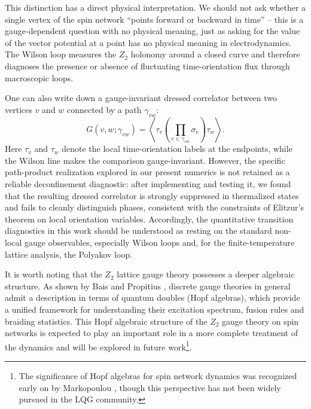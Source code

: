 \documentclass[preprint]{SciPost}
\theoremstyle{plain} %
\begin{document}
This distinction has a direct physical interpretation. We should not ask whether a single vertex of the spin network ``points forward or backward in time'' -- this is a gauge-dependent question with no physical meaning, just as asking for the value of the vector potential at a point has no physical meaning in electrodynamics. The Wilson loop measures the $Z_2$ holonomy around a closed curve and therefore diagnoses the presence or absence of fluctuating time-orientation flux through macroscopic loops.

One can also write down a gauge-invariant dressed correlator between two vertices $v$ and $w$ connected by a path $\gamma_{vw}$:
\begin{equation}\label{eqn:dressed-time-correlator}
	G(v,w;\gamma_{vw}) =
	\left\langle
		\tau_v
		\left(\prod_{e \in \gamma_{vw}} \sigma_e\right)
		\tau_w
	\right\rangle .
\end{equation}
Here $\tau_v$ and $\tau_w$ denote the local time-orientation labels at the endpoints, while the Wilson line makes the comparison gauge-invariant. However, the specific path-product realization explored in our present numerics is not retained as a reliable deconfinement diagnostic: after implementing and testing it, we found that the resulting dressed correlator is strongly suppressed in thermalized states and fails to cleanly distinguish phases, consistent with the constraints of Elitzur's theorem on local orientation variables. Accordingly, the quantitative transition diagnostics in this work should be understood as resting on the standard non-local gauge observables, especially Wilson loops and, for the finite-temperature lattice analysis, the Polyakov loop.

It is worth noting that the $ Z_2 $ lattice gauge theory possesses a deeper algebraic structure. As shown by Bais and Propitius \cite{Propitius1996Discrete}, discrete gauge theories in general admit a description in terms of quantum doubles (Hopf algebras), which provide a unified framework for understanding their excitation spectrum, fusion rules and braiding statistics. This Hopf algebraic structure of the $ Z_2 $ gauge theory on spin networks is expected to play an important role in a more complete treatment of the dynamics and will be explored in future work\footnote{The significance of Hopf algebras for spin network dynamics was recognized early on by Markopoulou \cite{Markopoulou1997Dual,Markopoulou2000Quantum}, though this perspective has not been widely pursued in the LQG community.}.
\end{document}
